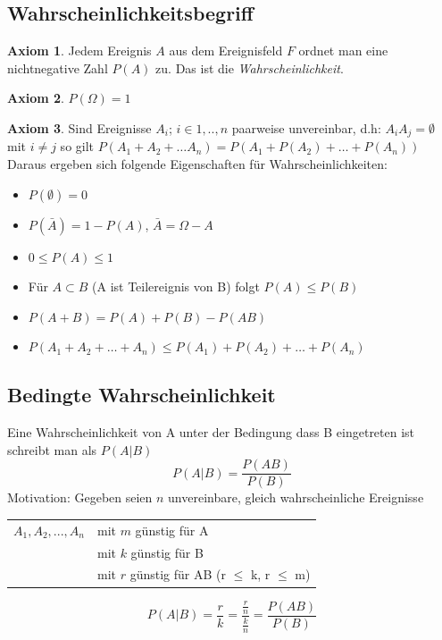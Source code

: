\documentclass[10pt]{report}
\def\firstcircle{(0,0) circle (1.5cm)}
\def\secondcircle{(45:2cm) circle (1.5cm)}
\def\thirdcircle{(0:2cm) circle (1.5cm)}
\theoremstyle{definition}
\newtheorem{axiom}{Axiom}
\begin{document}

\subsection{Wahrscheinlichkeitsbegriff}
\begin{axiom}
	Jedem Ereignis $A$ aus dem Ereignisfeld $F$ ordnet man eine nichtnegative Zahl $P(A)$ zu. Das ist die \textit{Wahrscheinlichkeit}.
\end{axiom}
\begin{axiom}
	 $P(\Omega)=1$
\end{axiom}
\begin{axiom}
	Sind Ereignisse $A_i$; $i\in {1,..,n}$ paarweise unvereinbar, d.h: $A_i A_j = \emptyset$ mit $i \neq j $ so gilt $P(A_1+A_2+ \ldots A_n) = P(A_1+P(A_2)+\ldots+P(A_n) )$ Daraus ergeben sich folgende Eigenschaften für Wahrscheinlichkeiten:
	\begin{itemize}
		\item $P(\emptyset)= 0$
		\item $P(\bar{A}) = 1 - P(A)$, $\bar{A} = \Omega -A$
		\item $ 0 \leq P(A) \leq 1$
		\item Für $A \subset B$ (A ist Teilereignis von B) folgt $P(A) \leq P(B)$
		\item $P(A+B) = P(A)+P(B)-P(AB)$
		\item  $P(A_1 + A_2+ \ldots +A_n) \leq P(A_1) + P(A_2)+ \ldots+P(A_n)$
	\end{itemize} 	
\end{axiom}

\subsection{Bedingte Wahrscheinlichkeit}
Eine Wahrscheinlichkeit von A unter der Bedingung dass B eingetreten ist schreibt man als $P(A|B)$
\[P(A|B) = \frac{P(AB)}{P(B)}\]
Motivation: Gegeben seien $n$ unvereinbare, gleich wahrscheinliche Ereignisse \\
\begin{tabular}{ll}
  $A_1,A_2,...,A_n$ & mit $m$ günstig für A \\
 & mit $k$ günstig für B \\ 
 & mit $r$ günstig für AB (r $\leq$ k, r $\leq$ m) \\ 
\end{tabular}
\[ P(A|B)=\frac{r}{k}=\frac{\frac{r}{n}}{\frac{k}{n}}=\frac{P(AB)}{P(B)} \]
\end{document}

